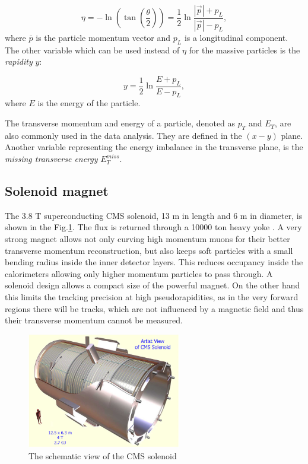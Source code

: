 \begin{equation}\label{eq:eta}
  \eta = -\ln(\tan(\frac{\theta}{2})) = \frac{1}{2}\ln\frac{|\vec{p}| + p_{L}}{|\vec{p}| - p_{L}},
\end{equation}
where $\bar{p}$ is the particle momentum vector and $p_{L}$ is a longitudinal component.
The other variable which can be used instead of $\eta$ for the massive particles is the \textit{rapidity} $y$:

\begin{equation}\label{eq:y}
  y = \frac{1}{2}\ln\frac{E + p_{L}}{E - p_{L}},
\end{equation} 
where $E$ is the energy of the particle.

The transverse momentum and energy of a particle, denoted as $p_{T}$ and $E_T$, are also commonly used in the data analysis. 
They are defined in the $(x-y)$ plane. Another variable representing the energy imbalance in the transverse plane, is the
\textit{missing transverse energy} $E_{T}^{miss}$.

\subsection{Solenoid magnet}\label{ssec:solenoid}

The 3.8 T superconducting CMS solenoid, 13 m in length and 6 m in diameter, is shown in the Fig.\ref{fig:solenoid}. 
The flux is returned through a 10000 ton heavy yoke \cite{CMSatLHC}. A very strong magnet allows not only curving
high momentum muons for their better transverse  momentum reconstruction, but also keeps soft particles with a small bending radius
inside the inner detector layers. This reduces occupancy inside the calorimeters allowing only higher
momentum particles to pass through. A solenoid design allows a compact size of the powerful magnet.
On the other hand this limits the tracking precision at high pseudorapidities, as in the very forward regions there will be 
tracks, which are not influenced by a magnetic field\cite{Dissertori:2010xe} and thus their transverse momentum cannot be measured.


\begin{figure}[t]
  \centering
  \includegraphics[width=0.6\textwidth]{02_experimental_setup/plots/CERN_CMS_Solenoid_schematic.jpg}
  \caption{The schematic view of the CMS solenoid}
  \label{fig:solenoid}
\end{figure}

